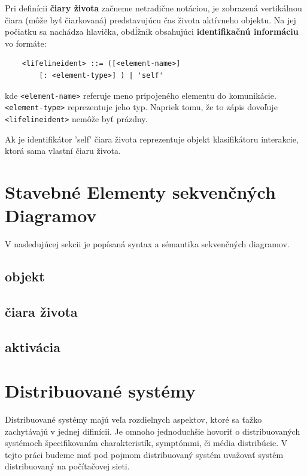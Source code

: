 \begin{defn}
	Pri definícii \textbf{čiary života} začneme netradične notáciou, je zobrazená vertikálnou čiara (môže byť čiarkovaná) predstavujúcu čas života aktívneho objektu. Na jej počiatku sa nachádza hlavička, obdĺžnik obsahujúci \textbf{identifikačnú informáciu} vo formáte: \\
	\begin{lstlisting}
	<lifelineident> ::= ([<element-name>]
		[: <element-type>] ) | 'self'
	\end{lstlisting} \vspace{.5cm}
	
	kde \lstinline{<element-name>} referuje meno pripojeného elementu do komunikácie. \lstinline{<element-type>} reprezentuje jeho typ. Napriek tomu, že to zápis dovoľuje \lstinline{<lifelineident>} nemôže byť prázdny.
	
	Ak je identifikátor 'self' čiara života reprezentuje objekt klasifikátoru interakcie, ktorá sama vlastní čiaru života.
	
	
\end{defn} 

\section{Stavebné Elementy sekvenčných Diagramov}

V nasledujúcej sekcii je popísaná syntax a sémantika sekvenčných diagramov.

\subsection{objekt}

\subsection{čiara života}

\subsection{aktivácia}

\section{Distribuované systémy}

Distribuované systémy majú veľa rozdielnych aspektov, ktoré sa ťažko zachytávajú v jednej difinícii. Je omnoho jednoduchšie hovoriť o distribuovaných systémoch špecifikovaním charakteristík, symptómmi, či média distribúcie. \cite{} V tejto práci budeme mať pod pojmom distribuovaný systém uvažovať systém distribuovaný na počítačovej sieti. \\

